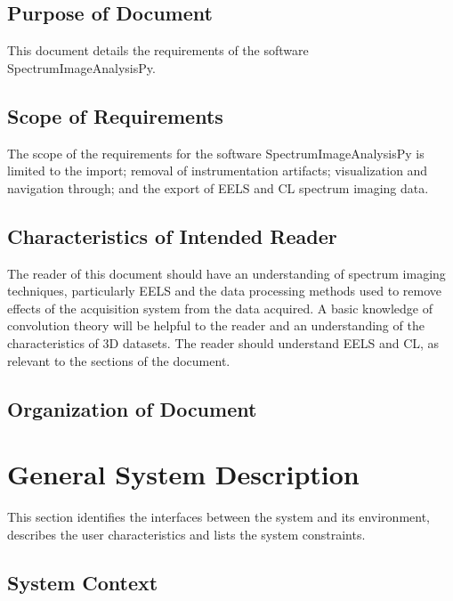 \documentclass[12pt]{article}
\newcommand{\progname}{SpectrumImageAnalysisPy} %
\begin{document}

\subsection{Purpose of Document}

This document details the requirements of the software \progname{}.

\subsection{Scope of Requirements} 
The scope of the requirements for the software \progname{} is limited to the import; removal of instrumentation artifacts; visualization and navigation through; and the export of EELS and CL spectrum imaging data.

\subsection{Characteristics of Intended Reader} 
The reader of this document should have an understanding of spectrum imaging techniques, particularly EELS and the data processing methods used to remove effects of the acquisition system from the data acquired. A basic knowledge of convolution theory will be helpful to the reader and an understanding of the characteristics of 3D datasets. The reader should understand EELS and CL, as relevant to the sections of the document.

\subsection{Organization of Document}

\section{General System Description}

This section identifies the interfaces between the system and its environment,
describes the user characteristics and lists the system constraints.

\subsection{System Context}
\end{document}

